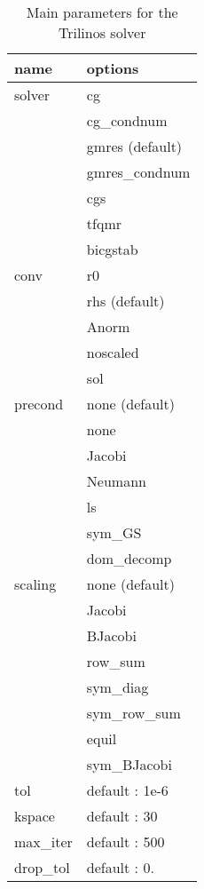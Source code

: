 \begin{table}
\begin{center}
\begin{tabular}{|l|l|}
\hline
name & options\\
\hline \hline
solver & cg \\
& cg\_condnum\\
& gmres (default)\\
& gmres\_condnum\\
& cgs\\
& tfqmr\\
& bicgstab\\
\hline
conv & r0\\
& rhs (default) \\
& Anorm  \\
& noscaled  \\
& sol \\
\hline

precond & none (default) \\
& none \\
&Jacobi \\
&Neumann \\
&ls \\
&sym\_GS \\
&dom\_decomp \\
\hline

scaling & none (default) \\
&    Jacobi \\
&    BJacobi \\
&    row\_sum \\
&    sym\_diag \\
&    sym\_row\_sum \\
&    equil \\
&    sym\_BJacobi \\

\hline

tol   & default : 1e-6  \\

\hline

kspace & default : 30  \\

\hline

max\_iter & default : 500  \\

\hline

drop\_tol & default : 0. \\

\hline

\end{tabular}
\end{center}
\caption{Main parameters for the Trilinos solver}
\label{table-solveroptions}
\end{table}

